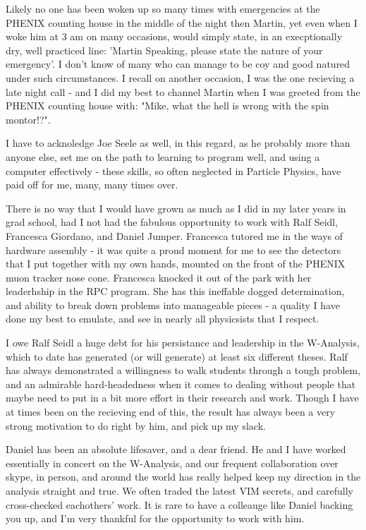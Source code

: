 Likely no one has been woken up so many times with emergencies at the PHENIX
counting house in the middle of the night then Martin, yet even when I woke him
at 3 am on many occasions, would simply state, in an execptionally dry, well
practiced line: 'Martin Speaking, please state the nature of your emergency'. I
don't know of many who can manage to be coy and good natured under such
circumstances. I recall on another occasion, I was the one recieving a late
night call - and I did my best to channel Martin when I was greeted from the
PHENIX counting house with: "Mike, what the hell is wrong with the spin
montor!?".

I have to acknoledge Joe Seele as well, in this regard, as he probably more
than anyone else, set me on the path to learning to program well, and using a
computer effectively - these skills, so often neglected in Particle Physics,
have paid off for me, many, many times over.

There is no way that I would have grown as much as I did in my later years in
grad school, had I not had the fabulous opportunity to work with Ralf Seidl,
Francesca Giordano, and Daniel Jumper. Francesca tutored me in the ways of
hardware assembly - it was quite a proud moment for me to see the detectors
that I put together with my own hands, mounted on the front of the PHENIX muon
tracker nose cone. Francesca knocked it out of the park with her leaderhship in
the RPC program. She has this ineffable dogged determination, and ability to
break down problems into manageable pieces - a quality I have done my best to
emulate, and see in nearly all physicsists that I respect.

I owe Ralf Seidl a huge debt for his persistance and leadership in the
W-Analysis, which to date has generated (or will generate) at least six
different theses. Ralf has always demonstrated a willingness to walk students
through a tough problem, and an admirable hard-headedness when it comes to
dealing without people that maybe need to put in a bit more effort in their
research and work. Though I have at times been on the recieving end of this, the
result has always been a very strong motivation to do right by him, and pick up
my slack.

Daniel has been an absolute lifesaver, and a dear friend. He and I have worked
essentially in concert on the W-Analysis, and our frequent collaboration over
skype, in person, and around the world has really helped keep my direction in
the analysis straight and true.  We often traded the latest VIM secrets, and
carefully cross-checked eachothers' work. It is rare to have a colleauge like
Daniel backing you up, and I'm very thankful for the opportunity to work with him.

